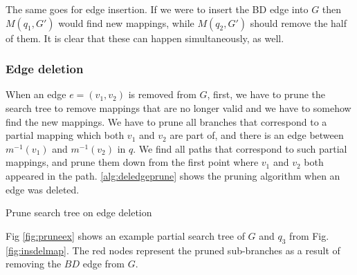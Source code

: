 The same goes for edge insertion. If we were to insert the BD edge into $G$ then
$M(q_1, G')$ would find new mappings, while $M(q_2, G')$ should remove the half 
of them. It is clear that these can happen simultaneously, as well.

\subsubsection{Edge deletion}

When an edge $e = (v_1, v_2)$ is removed from $G$, first, we have to prune the search
tree to remove mappings that are no longer valid and we have to somehow find the new 
mappings. We have to prune all branches that correspond to a partial mapping which both
$v_1$ and $v_2$ are part of, and there is an edge between $m^{-1}(v_1)$ and $m^{-1}(v_2)$ 
in $q$. We find all paths that correspond to such partial mappings, and prune them down
from the first point where $v_1$ and $v_2$ both appeared in the path. \ref{alg:deledgeprune}
shows the pruning algorithm when an edge was deleted.

\begin{algorithm}[htp]
    \SetAlgoLined\DontPrintSemicolon    
    
    \caption{Prune search tree on edge deletion}
    \label{alg:deledgeprune}
\end{algorithm}

Fig \ref{fig:pruneex} shows an example partial search tree of $G$ and $q_3$ from Fig. \ref{fig:insdelmap}.
The red nodes represent the pruned sub-branches as a result of removing the $BD$ edge from $G$.

